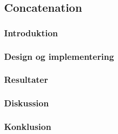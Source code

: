 \subsection{Concatenation}

\subsubsection{Introduktion}

\subsubsection{Design og implementering}

\subsubsection{Resultater}

\subsubsection{Diskussion}

\subsubsection{Konklusion}